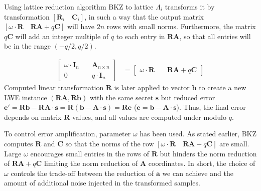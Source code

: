 Using lattice reduction algorithm BKZ to lattice $\Lambda_i$ transforms it by transformation $[\textbf{R}_i \hspace{1em} \textbf{C}_i]$, in such a way that the output matrix $[\omega \cdot \textbf{R} \hspace{1em}  \textbf{RA}+q\textbf{C}]$ will have $2n$ rows with small norms. Furthermore, the matrix $q\textbf{C}$ will add an integer multiple of $q$ to each entry in $\textbf{RA}$, so that all entries will be in the range $(-q/2,q/2)$.

\begin{align*}
    [\textbf{R}_{2n \times n} \hspace{1em} \textbf{C}_{2n \times n}]
    \begin{bmatrix}
        \omega \cdot \textbf{I}_n \hspace{1em} &  \textbf{A}_{n\times n} \\
        0                         \hspace{1em} &  q \cdot \textbf{I}_n
    \end{bmatrix} &=
    \begin{bmatrix}
        \omega \cdot \textbf{R}  \hspace{1em} &  \textbf{RA}+q\textbf{C}
    \end{bmatrix}
\end{align*}
Computed linear transformation $\textbf{R}$ is later applied to vector $\textbf{b}$ to create a new  LWE instance $(\textbf{RA},\textbf{Rb})$ with the same secret $\textbf{s}$ but reduced error $\textbf{e}'=\textbf{Rb}-\textbf{RA} \cdot \textbf{s}=\textbf{R}(\textbf{b}-\textbf{A}\cdot\textbf{s})=\textbf{Re}$ ($\textbf{e}=\textbf{b}-\textbf{A}\cdot \textbf{s}$). Thus, the final error depends on matrix $\textbf{R}$ values, and all values are computed under modulo $q$.

To control error amplification, parameter $\omega$ has been used. As stated earlier, BKZ computes $\textbf{R}$ and $\textbf{C}$ so that the norms of the row $[\omega \cdot \textbf{R} \hspace{1em}  \textbf{RA}+q\textbf{C}]$ are small. Large $\omega$ encourages small entries in the rows of $\textbf{R}$ but hinders the norm reduction of $\textbf{RA}+q\textbf{C}$ limiting the norm reduction of $\textbf{A}$ coordinates. In short, the choice of $\omega$ controls the trade-off between the reduction of $\textbf{a}$ we can achieve and the amount of additional noise injected in the transformed samples.

